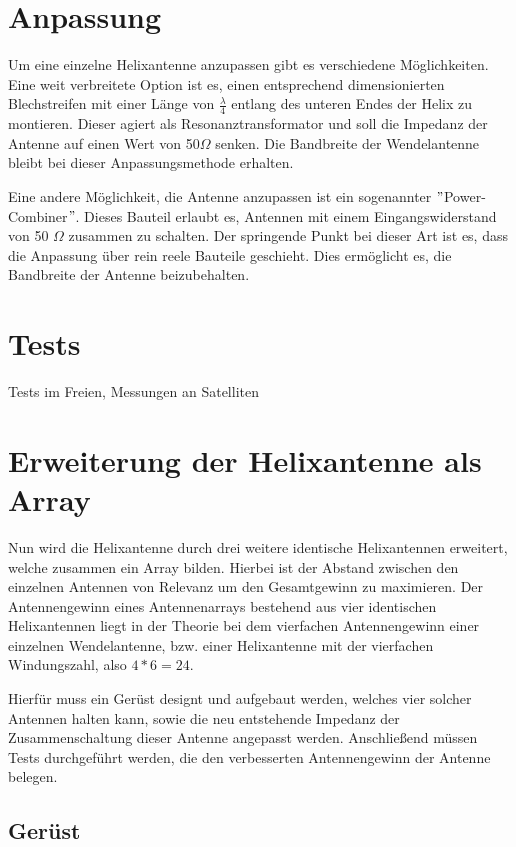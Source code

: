 
\section{Anpassung}
Um eine einzelne Helixantenne anzupassen gibt es verschiedene Möglichkeiten. Eine weit verbreitete Option ist es, einen entsprechend dimensionierten Blechstreifen mit einer Länge von $\frac{\lambda}{4}$ entlang des unteren Endes der Helix zu montieren. Dieser agiert als Resonanztransformator und soll die Impedanz der Antenne auf einen Wert von 50$\Omega$ senken. Die Bandbreite der Wendelantenne bleibt bei dieser Anpassungsmethode erhalten.

Eine andere Möglichkeit, die Antenne anzupassen ist ein sogenannter $"$Power-Combiner$"$. Dieses Bauteil erlaubt es, Antennen mit einem Eingangswiderstand von 50 $\Omega$ zusammen zu schalten. Der springende Punkt bei dieser Art ist es, dass die Anpassung über rein reele Bauteile geschieht. Dies ermöglicht es, die Bandbreite der Antenne beizubehalten.



\section{Tests}
Tests im Freien, Messungen an Satelliten

\section{Erweiterung der Helixantenne als Array}
Nun wird die Helixantenne durch drei weitere identische Helixantennen erweitert, welche zusammen ein Array bilden. Hierbei ist der Abstand zwischen den einzelnen Antennen von Relevanz um den Gesamtgewinn zu maximieren.
Der Antennengewinn eines Antennenarrays bestehend aus vier identischen Helixantennen liegt in der Theorie bei dem vierfachen Antennengewinn einer einzelnen Wendelantenne, bzw. einer Helixantenne mit der vierfachen Windungszahl, also $4*6=24$.

Hierfür muss ein Gerüst designt und aufgebaut werden, welches vier solcher Antennen halten kann, sowie die neu entstehende Impedanz der Zusammenschaltung dieser Antenne angepasst werden. Anschließend müssen Tests durchgeführt werden, die den verbesserten Antennengewinn der Antenne belegen.

\subsection{Gerüst}

